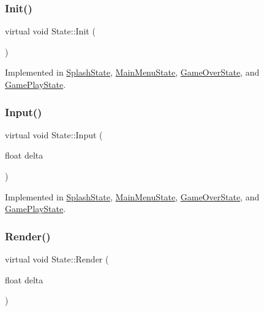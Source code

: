 \subsubsection{\texorpdfstring{Init()}{Init()}}
{\footnotesize\ttfamily virtual void State\+::\+Init (\begin{DoxyParamCaption}{ }\end{DoxyParamCaption})\hspace{0.3cm}{\ttfamily [pure virtual]}}



Implemented in \hyperlink{classSplashState_ae3e0604da087032c179593c237580988}{Splash\+State}, \hyperlink{classMainMenuState_afab2a9b829a8ef752fed701d5cd260f8}{Main\+Menu\+State}, \hyperlink{classGameOverState_aa3d4f165ff735552f16132e929d369c2}{Game\+Over\+State}, and \hyperlink{classGamePlayState_ae13389eea1f83f27d18ba200f107937d}{Game\+Play\+State}.

\mbox{\label{classState_a1705412877f37a5cc8fc712542756076}} 
\subsubsection{\texorpdfstring{Input()}{Input()}}
{\footnotesize\ttfamily virtual void State\+::\+Input (\begin{DoxyParamCaption}\item[{float}]{delta }\end{DoxyParamCaption})\hspace{0.3cm}{\ttfamily [pure virtual]}}



Implemented in \hyperlink{classSplashState_adb2eb87bd89e41af0c3a9d0903e89450}{Splash\+State}, \hyperlink{classMainMenuState_aa62c91d35b5b4a24c0a13c22020845e8}{Main\+Menu\+State}, \hyperlink{classGameOverState_adb4be2a5c6292d020999c2da9588ebfc}{Game\+Over\+State}, and \hyperlink{classGamePlayState_a3bc9231fd11546b5dd13581ed2aa1afa}{Game\+Play\+State}.

\mbox{\label{classState_a0e48dfae1e3090630475812681417c5f}} 
\subsubsection{\texorpdfstring{Render()}{Render()}}
{\footnotesize\ttfamily virtual void State\+::\+Render (\begin{DoxyParamCaption}\item[{float}]{delta }\end{DoxyParamCaption})\hspace{0.3cm}{\ttfamily [pure virtual]}}



